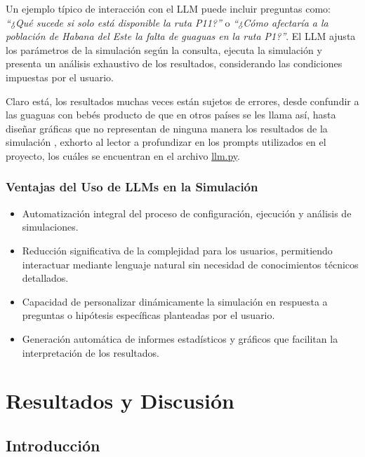 \documentclass[a4paper,12pt]{article}
\begin{document}
Un ejemplo típico de interacción con el LLM puede incluir preguntas como: \textit{“¿Qué sucede si solo está disponible la ruta P11?”} o \textit{“¿Cómo afectaría a la población de Habana del Este la falta de guaguas en la ruta P1?”}. El LLM ajusta los parámetros de la simulación según la consulta, ejecuta la simulación y presenta un análisis exhaustivo de los resultados, considerando las condiciones impuestas por el usuario.

Claro está, los resultados muchas veces están sujetos de errores, desde confundir a las guaguas con bebés producto de que en otros países se les llama así, hasta diseñar gráficas que no representan de ninguna manera los resultados de la simulaci\'on , exhorto al lector a profundizar en los prompts utilizados en el proyecto, los cuáles se encuentran en el archivo \href{https://github.com/YoanRene/AI-Sim/blob/master/src/llm.py}{llm.py}.

\subsubsection{Ventajas del Uso de LLMs en la Simulación}
\begin{itemize}
    \item Automatización integral del proceso de configuración, ejecución y análisis de simulaciones.
    \item Reducción significativa de la complejidad para los usuarios, permitiendo interactuar mediante lenguaje natural sin necesidad de conocimientos técnicos detallados.
    \item Capacidad de personalizar dinámicamente la simulación en respuesta a preguntas o hipótesis específicas planteadas por el usuario.
    \item Generación automática de informes estadísticos y gráficos que facilitan la interpretación de los resultados.
\end{itemize}




\section{Resultados y Discusi\'on}

\subsection{Introducción}
\end{document}
